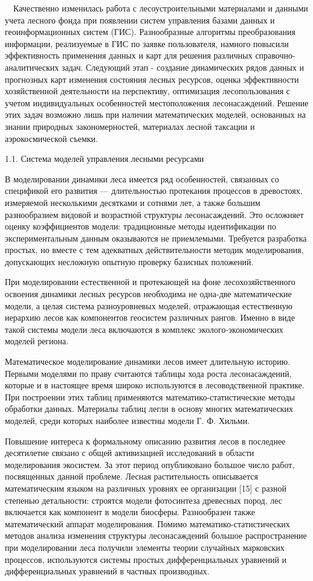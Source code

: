 \documentclass{report}
\begin{document}
\ \ Качественно изменилась работа с лесоустроительными материалами и данными учета лесного фонда при появлении систем
управления базами данных и геоинформационных систем (ГИС). Разнообразные алгоритмы преобразования информации,
реализуемые в ГИС по заявке пользователя, намного повысили эффективность применения данных и карт для решения различных
справочно-аналитических задач. Следующий этап - создание динамических рядов данных и прогнозных карт изменения 
состояния лесных ресурсов, оценка эффективности хозяйственной деятельности на перспективу, оптимизация лесопользования
с учетом индивидуальных особенностей местоположения лесонасаждений. Решение этих задач возможно лишь при наличии
математических моделей, основанных на знании природных закономерностей, материалах лесной таксации и аэрокосмической
съемки. 

1.1. Система моделей управления лесными ресурсами

В моделировании динамики леса имеется ряд особенностей, связанных со спецификой его развития — длительностью протекания
процессов в древостоях, измеряемой несколькими десятка\-ми и сотнями лет, а также большим разнообразием видовой и
возрастной  структуры лесонасаждений. Это осложняет оценку коэффициентов модели: традиционные методы идентификации по
экспериментальным данным оказываются не приемлемыми. Требуется разработка простых, но вместе с тем адекватных
действительности методик моделирования, допускающих несложную опытную проверку базисных положений.

При моделировании естественной и протекающей на фоне лесохозяйственного освоения динамики лесных ресурсов необ\-ходима
не одна-две математические модели, а целая система разноуровневых моделей, отражающая естественную иерархию лесов как
компонентов геосистем различных рангов. Именно в ви\-де такой системы модели леса включаются в комплекс
эколого-экономических моделей региона. 

Математическое моделирование динамики лесов имеет дли\-тельную историю. Первыми моделями по праву считаются табли\-цы
хода роста лесонасаждений, которые и в настоящее время широко используются в лесоводственной практике. При построении
этих таблиц применяются математико-статистические методы об\-работки данных. Материалы таблиц легли в основу многих
мате\-матических моделей, среди которых наиболее известны модели Г. Ф. Хильми.

Повышение интереса к формальному описанию развития лесов в последнее десятилетие связано с общей активизацией
исследова\-ний в области моделирования экосистем. За этот период опубли\-ковано большое число работ, посвященных данной
проблеме. Лесная растительность описывается математическим языком на различных уровнях ее организации [15] с разной
степенью детальности: строятся модели фотосинтеза древесных пород, лес включается как компонент в модели биосферы.
Разнообразен также математический аппарат моделирования. Помимо математико-статистических методов анализа изменения
структуры лесонасаждений большое распространение при моделировании леса получили элементы тео\-рии случайных марковских
процессов, используются системы простых дифферен\-циальных уравнений  и дифферен\-циальных уравнений в частных
производных.
\end{document}
